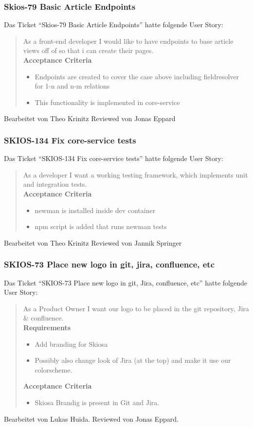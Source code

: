 \subsubsection{Skios-79 Basic Article Endpoints}
Das Ticket \enquote{Skios-79 Basic Article Endpoints} hatte folgende User Story:
\begin{quotation}
    As a front-end developer I would like to have endpoints to base article views off of so that i can create their pages.\\
    \textbf{Acceptance Criteria}
    \begin{itemize}
        \item Endpoints are created to cover the case above including fieldresolver for 1-n and n-m relations
        \item This functionality is implemented in core-service
    \end{itemize}
\end{quotation}
Bearbeitet von Theo Krinitz
Reviewed von Jonas Eppard

\subsubsection{SKIOS-134 Fix core-service tests}
Das Ticket \enquote{SKIOS-134 Fix core-service tests} hatte folgende User Story:
\begin{quotation}
    As a developer I want a working testing framework, which implements unit and integration tests.\\
    \textbf{Acceptance Criteria}
    \begin{itemize}
        \item newman is installed inside dev container
        \item npm script is added that runs newman tests
    \end{itemize}
\end{quotation}
Bearbeitet von Theo Krinitz
Reviewed von Jannik Springer

\subsubsection{SKIOS-73 Place new logo in git, jira, confluence, etc}
Das Ticket \enquote{SKIOS-73 Place new logo in git, Jira, confluence, etc} hatte folgende User Story:
\begin{quotation}
    As a Product Owner I want our logo to be placed in the git repository, Jira \& confluence. \\
    \textbf{Requirements}
    \begin{itemize}
        \item Add branding for Skiosa
        \item Possibly also change look of Jira (at the top) and make it use our colorscheme.  
    \end{itemize}   
    
    \textbf{Acceptance Criteria}
    \begin{itemize}
        \item Skiosa Brandig is present in Git and Jira.
    \end{itemize}
\end{quotation}
Bearbeitet von Lukas Huida.
Reviewed von Jonas Eppard.

